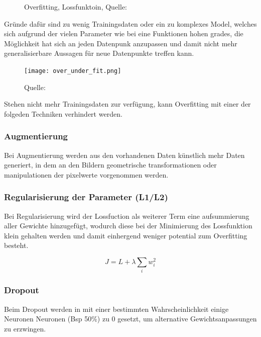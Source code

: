 \begin{figure}[H]
    \centering
    \def\svgwidth{0.5\textwidth}
    
    \caption{Overfitting, Lossfunktoin, Quelle: \cite{overfittingPlot}}
    \label{fig:overfitting}
\end{figure}

Gründe dafür sind zu wenig Trainingsdaten oder ein zu komplexes Model, 
welches sich aufgrund der vielen Parameter wie bei eine Funktionen hohen
grades, die Möglichkeit hat sich an jeden Datenpunk 
anzupassen und damit nicht mehr generalisierbare Aussagen 
für neue Datenpunkte treffen kann.


\begin{figure}[htb]
    \centering
    \texttt{[image: over\_under\_fit.png]}
    \caption{Quelle: \cite{deshpGuideImprovingDeep2017a}}
    \label{fig:over_under_fit}
\end{figure}


Stehen nicht mehr Trainingsdaten zur verfügung, kann Overfitting
mit einer der folgeden Techniken verhindert werden.


\subsubsection{Augmentierung}
Bei Augmentierung werden aus den vorhandenen Daten künstlich mehr 
Daten generiert, in dem an den Bildern geometrische transformationen 
oder manipulationen der pixelwerte vorgenommen werden.

\subsubsection{Regularisierung der Parameter (L1/L2)}
Bei Regularisierung wird der Lossfuction als weiterer Term
eine aufsummierung aller Gewichte hinzugefügt,
wodurch diese bei der Minimierung des Lossfunktion 
klein gehalten werden und damit einhergend weniger potential 
zum Overfitting besteht.

\begin{equation}
    \label{eq:regularization}
    J = L + \lambda \sum_{i} w_{i}^{2}
\end{equation}

\subsubsection{Dropout}
Beim Dropout werden in mit einer bestimmten Wahrscheinlichkeit 
einige Neuronen Neuronen (Bsp 50\%) zu 0 gesetzt, um 
alternative Gewichtsanpassungen zu erzwingen.


